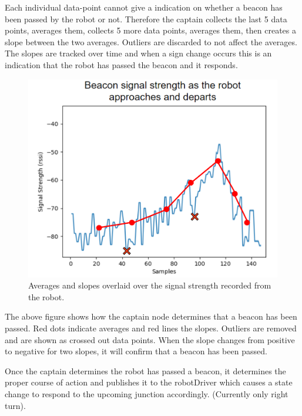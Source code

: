 \documentclass[12pt]{report}
\begin{document}
Each individual data-point cannot give a indication on whether a beacon has been passed by the robot or not. Therefore the captain collects the last 5 data points, averages them, collects 5 more data points, averages them, then creates a slope between the two averages. Outliers are discarded to not affect the averages. The slopes are tracked over time and when a sign change occurs this is an indication that the robot has passed the beacon and it responds. 

\begin{figure}[H]
    \centering
    \includegraphics[scale=0.4]{images/CaptainDataAnalysis.png}
    \caption{Averages and slopes overlaid over the signal strength recorded from the robot.}
    \label{Captain Node Data Analysis}
\end{figure}

The above figure shows how the captain node determines that a beacon has been passed. Red dots indicate averages and red lines the slopes. Outliers are removed and are shown as crossed out data points. When the slope changes from positive to negative for two slopes, it will confirm that a beacon has been passed.

Once the captain determines the robot has passed a beacon, it determines the proper course of action and publishes it to the robotDriver which causes a state change to respond to the upcoming junction accordingly. (Currently only right turn).
\end{document}
